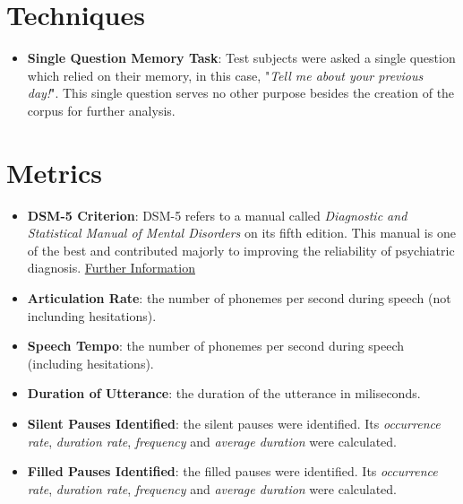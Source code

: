 \documentclass{Paper_Summary}
\begin{document}
\section{Techniques}
    \begin{itemize}
        \item \textbf{Single Question Memory Task}: Test subjects were asked a single question which relied on their memory, in this case, "\emph{Tell me about your previous day!}". This single question serves no other purpose besides the creation of the corpus for further analysis.
    \end{itemize}

\section{Metrics}
    \begin{itemize}
        \item \textbf{DSM-5 Criterion}: DSM-5 refers to a manual called \emph{Diagnostic and Statistical Manual of Mental Disorders} on its fifth edition. This manual is one of the best and contributed majorly to improving the reliability of psychiatric diagnosis. \href{https://en.wikipedia.org/wiki/DSM-5}{Further Information}
        \item \textbf{Articulation Rate}: the number of phonemes per second during speech (not inclunding hesitations).
        \item \textbf{Speech Tempo}: the number of phonemes per second during speech (including hesitations).
        \item \textbf{Duration of Utterance}: the duration of the utterance in miliseconds.
        \item \textbf{Silent Pauses Identified}: the silent pauses were identified. Its \emph{occurrence rate}, \emph{duration rate}, \emph{frequency} and \emph{average duration} were calculated.
        \item \textbf{Filled Pauses Identified}: the filled pauses were identified. Its \emph{occurrence rate}, \emph{duration rate}, \emph{frequency} and \emph{average duration} were calculated.
    \end{itemize}
\end{document}
